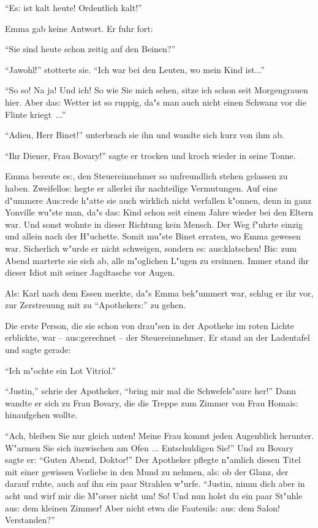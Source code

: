 \documentclass[oneside,12pt]{book}
\newcommand{\s}{s:}%
\begin{document}
"`E{\s} ist kalt heute! Ordentlich kalt!"'

Emma gab keine Antwort. Er fuhr fort:

"`Sie sind heute schon zeitig auf den Beinen?"'

"`Jawohl!"' stotterte sie. "`Ich war bei den Leuten, wo mein Kind
ist..."'

"`So so! Na ja! Und ich! So wie Sie mich sehen, sitze ich schon
seit Morgengrauen hier. Aber da{\s} Wetter ist so ruppig, da"s man
auch nicht einen Schwanz vor die Flinte kriegt~..."'

"`Adieu, Herr Binet!"' unterbrach sie ihn und wandte sich kurz von
ihm ab.

"`Ihr Diener, Frau Bovary!"' sagte er trocken und kroch wieder in
seine Tonne.

Emma bereute e{\s}, den Steuereinnehmer so unfreundlich stehen
gelassen zu haben. Zweifello{\s} hegte er allerlei ihr nachteilige
Vermutungen. Auf eine d"ummere Au{\s}rede h"atte sie auch wirklich
nicht verfallen k"onnen, denn in ganz Yonville wu"ste man, da"s
da{\s} Kind schon seit einem Jahre wieder bei den Eltern war. Und
sonst wohnte in dieser Richtung kein Mensch. Der Weg f"uhrte
einzig und allein nach der H"uchette. Somit mu"ste Binet erraten,
wo Emma gewesen war. Sicherlich w"urde er nicht schweigen, sondern
e{\s} au{\s}klatschen! Bi{\s} zum Abend marterte sie sich ab, alle
m"oglichen L"ugen zu ersinnen. Immer stand ihr dieser Idiot mit
seiner Jagdtasche vor Augen.

Al{\s} Karl nach dem Essen merkte, da"s Emma bek"ummert war,
schlug er ihr vor, zur Zerstreuung mit zu "`Apotheker{\s}"' zu
gehen.

Die erste Person, die sie schon von drau"sen in der Apotheke im
roten Lichte erblickte, war -- au{\s}gerechnet -- der
Steuereinnehmer. Er stand an der Ladentafel und sagte gerade:

"`Ich m"ochte ein Lot Vitriol."'

"`Justin,"' schrie der Apotheker, "`bring mir mal die Schwefels"aure
her!"' Dann wandte er sich zu Frau Bovary, die die Treppe zum
Zimmer von Frau Homai{\s} hinaufgehen wollte.

"`Ach, bleiben Sie nur gleich unten! Meine Frau kommt jeden
Augenblick herunter. W"armen Sie sich inzwischen am Ofen ...
Entschuldigen Sie!"' Und zu Bovary sagte er: "`Guten Abend,
Doktor!"' Der Apotheker pflegte n"amlich diesen Titel mit einer
gewissen Vorliebe in den Mund zu nehmen, al{\s} ob der Glanz, der
darauf ruhte, auch auf ihn ein paar Strahlen w"urfe. "`Justin,
nimm dich aber in acht und wirf mir die M"orser nicht um! So! Und
nun holst du ein paar St"uhle au{\s} dem kleinen Zimmer! Aber
nicht etwa die Fauteuil{\s} au{\s} dem Salon! Verstanden?"'
\end{document}
